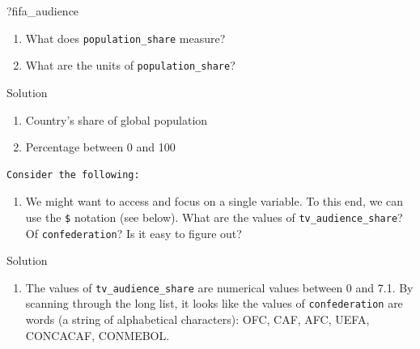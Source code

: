 \documentclass[
  letterpaper,
  DIV=11,
  numbers=noendperiod]{scrreprt}
\newenvironment{Shaded}{\begin{snugshade}}{\end{snugshade}}
\newcommand{\NormalTok}[1]{\textcolor[rgb]{0.00,0.23,0.31}{#1}}
\newcommand{\SpecialCharTok}[1]{\textcolor[rgb]{0.37,0.37,0.37}{#1}}
\providecommand{\tightlist}{%
  \setlength{\itemsep}{0pt}\setlength{\parskip}{0pt}}\usepackage{longtable,booktabs,array}
\begin{document}
\begin{Shaded}
\begin{Highlighting}[]
\NormalTok{?fifa\_audience}
\end{Highlighting}
\end{Shaded}

\begin{enumerate}
\def\labelenumi{\alph{enumi}.}
\tightlist
\item
  What does \texttt{population\_share} measure?
\item
  What are the units of \texttt{population\_share}?
\end{enumerate}

Solution

\begin{enumerate}
\def\labelenumi{\alph{enumi}.}
\tightlist
\item
  Country's share of global population
\item
  Percentage between 0 and 100
\end{enumerate}

\begin{verbatim}
Consider the following:
\end{verbatim}

\begin{enumerate}
\def\labelenumi{\alph{enumi}.}
\tightlist
\item
  We might want to access and focus on a single variable. To this end,
  we can use the \texttt{\$} notation (see below). What are the values
  of \texttt{tv\_audience\_share}? Of \texttt{confederation}? Is it easy
  to figure out?
\end{enumerate}

\begin{Shaded}
\end{Shaded}

Solution

\begin{enumerate}
\def\labelenumi{\alph{enumi}.}
\tightlist
\item
  The values of \texttt{tv\_audience\_share} are numerical values
  between 0 and 7.1. By scanning through the long list, it looks like
  the values of \texttt{confederation} are words (a string of
  alphabetical characters): OFC, CAF, AFC, UEFA, CONCACAF, CONMEBOL.
\end{enumerate}
\end{document}
